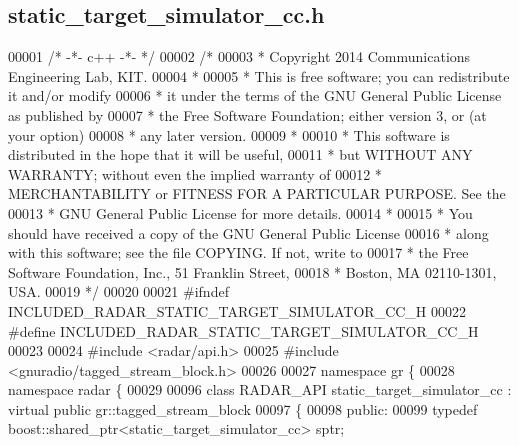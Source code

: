 \subsection{static\+\_\+target\+\_\+simulator\+\_\+cc.\+h}
\label{static__target__simulator__cc_8h_source}

\begin{DoxyCode}
00001 \textcolor{comment}{/* -*- c++ -*- */}
00002 \textcolor{comment}{/*}
00003 \textcolor{comment}{ * Copyright 2014 Communications Engineering Lab, KIT.}
00004 \textcolor{comment}{ *}
00005 \textcolor{comment}{ * This is free software; you can redistribute it and/or modify}
00006 \textcolor{comment}{ * it under the terms of the GNU General Public License as published by}
00007 \textcolor{comment}{ * the Free Software Foundation; either version 3, or (at your option)}
00008 \textcolor{comment}{ * any later version.}
00009 \textcolor{comment}{ *}
00010 \textcolor{comment}{ * This software is distributed in the hope that it will be useful,}
00011 \textcolor{comment}{ * but WITHOUT ANY WARRANTY; without even the implied warranty of}
00012 \textcolor{comment}{ * MERCHANTABILITY or FITNESS FOR A PARTICULAR PURPOSE.  See the}
00013 \textcolor{comment}{ * GNU General Public License for more details.}
00014 \textcolor{comment}{ *}
00015 \textcolor{comment}{ * You should have received a copy of the GNU General Public License}
00016 \textcolor{comment}{ * along with this software; see the file COPYING.  If not, write to}
00017 \textcolor{comment}{ * the Free Software Foundation, Inc., 51 Franklin Street,}
00018 \textcolor{comment}{ * Boston, MA 02110-1301, USA.}
00019 \textcolor{comment}{ */}
00020 
00021 \textcolor{preprocessor}{#ifndef INCLUDED\_RADAR\_STATIC\_TARGET\_SIMULATOR\_CC\_H}
00022 \textcolor{preprocessor}{#define INCLUDED\_RADAR\_STATIC\_TARGET\_SIMULATOR\_CC\_H}
00023 
00024 \textcolor{preprocessor}{#include <radar/api.h>}
00025 \textcolor{preprocessor}{#include <gnuradio/tagged\_stream\_block.h>}
00026 
00027 \textcolor{keyword}{namespace }gr \{
00028     \textcolor{keyword}{namespace }radar \{
00029 
00096         \textcolor{keyword}{class }RADAR_API static_target_simulator_cc : \textcolor{keyword}{virtual} \textcolor{keyword}{public} gr::tagged\_stream\_block
00097         \{
00098         \textcolor{keyword}{public}:
00099             \textcolor{keyword}{typedef} boost::shared\_ptr<static\_target\_simulator\_cc> sptr;

\end{DoxyCode}

